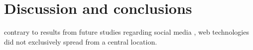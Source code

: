 \documentclass[
  authoryear,
  preprint,
  3p]{elsarticle}
\begin{document}
\section{Discussion and conclusions}\label{discussion-and-conclusions}

contrary to results from future studies regarding social media
\citep{lengyel2020role}, web technologies did not exclusively spread
from a central location.


\renewcommand\refname{References}
  
\end{document}
